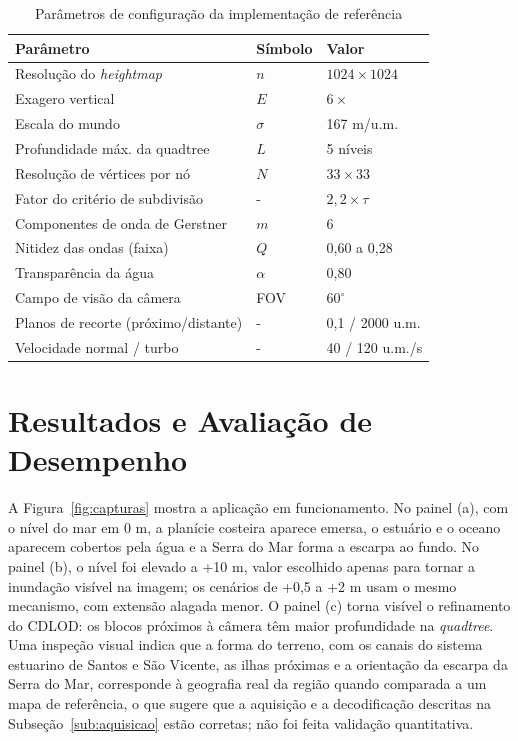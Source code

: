 \documentclass[conference]{IEEEtran}
\newcommand{\fonte}[1]{\par\vspace{2pt}{\footnotesize Fonte: #1\par}}
\begin{document}
\begin{table}[t]
\caption{Parâmetros de configuração da implementação de referência}
\label{tab:parametros}
\centering
\begin{tabular}{@{}p{3.1cm}p{0.9cm}p{2.4cm}@{}}
\toprule
\textbf{Parâmetro} & \textbf{Símbolo} & \textbf{Valor} \\
\midrule
Resolução do \emph{heightmap} & $n$ & $1024 \times 1024$ \\
Exagero vertical & $E$ & $6\times$ \\
Escala do mundo & $\sigma$ & 167 m/u.m. \\
Profundidade máx. da quadtree & $L$ & 5 níveis \\
Resolução de vértices por nó & $N$ & $33 \times 33$ \\
Fator do critério de subdivisão & - & $2{,}2 \times \tau$ \\
Componentes de onda de Gerstner & $m$ & 6 \\
Nitidez das ondas (faixa) & $Q$ & 0,60 a 0,28 \\
Transparência da água & $\alpha$ & 0,80 \\
Campo de visão da câmera & FOV & $60^{\circ}$ \\
Planos de recorte (próximo/distante) & - & 0,1 / 2000 u.m. \\
Velocidade normal / turbo & - & 40 / 120 u.m./s \\
\bottomrule
\end{tabular}
\fonte{Elaborado pelos autores (2026), com base no código-fonte da implementação.}
\end{table}

\section{Resultados e Avaliação de Desempenho}
\label{sec:resultados}

A Figura~\ref{fig:capturas} mostra a aplicação em funcionamento. No painel
(a), com o nível do mar em 0 m, a planície costeira aparece emersa, o
estuário e o oceano aparecem cobertos pela água e a Serra do Mar forma a
escarpa ao fundo. No painel (b), o nível
foi elevado a +10 m, valor escolhido apenas para tornar a inundação
visível na imagem; os cenários de +0,5 a +2 m usam o mesmo mecanismo, com
extensão alagada menor. O painel (c) torna visível o refinamento do CDLOD:
os blocos próximos à câmera têm maior profundidade na \emph{quadtree}. Uma
inspeção visual indica que a forma do terreno, com os canais do sistema
estuarino de Santos e São Vicente, as ilhas próximas e a orientação da
escarpa da Serra do Mar, corresponde à geografia real da região quando
comparada a um mapa de referência, o que sugere que a aquisição e a
decodificação descritas na Subseção~\ref{sub:aquisicao} estão corretas;
não foi feita validação quantitativa.
\end{document}

